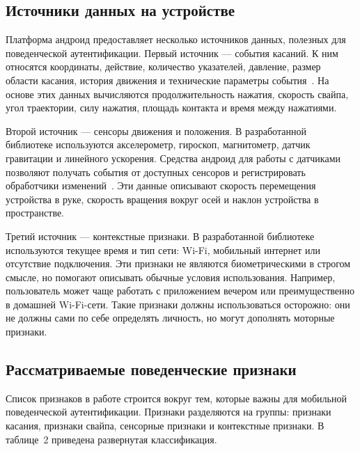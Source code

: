\documentclass[oneside,senior,etd]{BYUPhys}
\begin{document}
\subsection{Источники данных на устройстве}

Платформа андроид предоставляет несколько источников данных, полезных для поведенческой аутентификации. Первый источник --- события касаний. К ним относятся координаты, действие, количество указателей, давление, размер области касания, история движения и технические параметры события~\cite{androidmotionevent}. На основе этих данных вычисляются продолжительность нажатия, скорость свайпа, угол траектории, силу нажатия, площадь контакта и время между нажатиями.

Второй источник --- сенсоры движения и положения. В разработанной библиотеке используются акселерометр, гироскоп, магнитометр, датчик гравитации и линейного ускорения. Средства андроид для работы с датчиками позволяют получать события от доступных сенсоров и регистрировать обработчики изменений~\cite{androidsensors,androidsensorevent}. Эти данные описывают скорость перемещения устройства в руке, скорость вращения вокруг осей и наклон устройства в пространстве.

Третий источник --- контекстные признаки. В разработанной библиотеке используются текущее время и тип сети: Wi-Fi, мобильный интернет или отсутствие подключения. Эти признаки не являются биометрическими в строгом смысле, но помогают описывать обычные условия использования. Например, пользователь может чаще работать с приложением вечером или преимущественно в домашней Wi-Fi-сети. Такие признаки должны использоваться осторожно: они не должны сами по себе определять личность, но могут дополнять моторные признаки.

\subsection{Рассматриваемые поведенческие признаки}

Список признаков в работе строится вокруг тем, которые важны для мобильной поведенческой аутентификации. Признаки разделяются на группы: признаки касания, признаки свайпа, сенсорные признаки и контекстные признаки. В таблице~2 приведена развернутая классификация.

\clearpage
\end{document}
